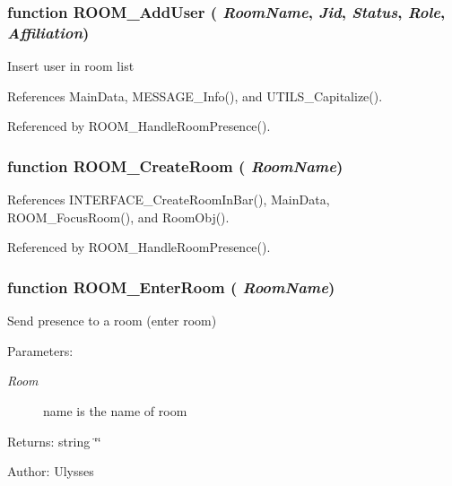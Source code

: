 \subsubsection{\setlength{\rightskip}{0pt plus 5cm}function ROOM\_\-AddUser ( {\em RoomName}, \/   {\em Jid}, \/   {\em Status}, \/   {\em Role}, \/   {\em Affiliation})}\label{room_2room_8js_d458a1c31c7bc15a3e6d33fb2ec66bcb}


Insert user in room list 

References MainData, MESSAGE\_\-Info(), and UTILS\_\-Capitalize().

Referenced by ROOM\_\-HandleRoomPresence().
\subsubsection{\setlength{\rightskip}{0pt plus 5cm}function ROOM\_\-CreateRoom ( {\em RoomName})}\label{room_2room_8js_f6fef7f6fb3a2e158577ab49889bb426}




References INTERFACE\_\-CreateRoomInBar(), MainData, ROOM\_\-FocusRoom(), and RoomObj().

Referenced by ROOM\_\-HandleRoomPresence().
\subsubsection{\setlength{\rightskip}{0pt plus 5cm}function ROOM\_\-EnterRoom ( {\em RoomName})}\label{room_2room_8js_bf1ecfaa126d14e1beffee4131c0f3b8}


Send presence to a room (enter room)

\begin{Desc}
\item[Parameters:]
\begin{description}
\item[{\em Room}]name is the name of room \end{description}
\end{Desc}
\begin{Desc}
\item[Returns:]string \char`\"{}\char`\"{} \end{Desc}
\begin{Desc}
\item[Author:]Ulysses \end{Desc}


